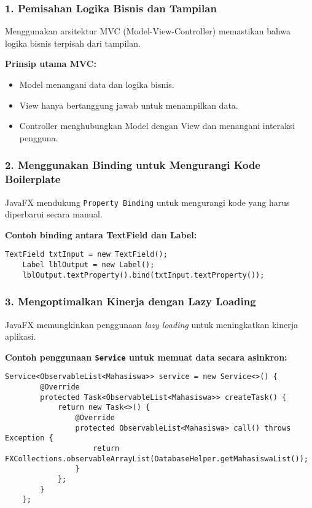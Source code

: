 \subsubsection{1. Pemisahan Logika Bisnis dan Tampilan}

Menggunakan arsitektur MVC (Model-View-Controller) memastikan bahwa logika bisnis terpisah dari tampilan.

\textbf{Prinsip utama MVC:}
\begin{itemize}
	\item Model menangani data dan logika bisnis.
	\item View hanya bertanggung jawab untuk menampilkan data.
	\item Controller menghubungkan Model dengan View dan menangani interaksi pengguna.
\end{itemize}

\subsubsection{2. Menggunakan Binding untuk Mengurangi Kode Boilerplate}

JavaFX mendukung \texttt{Property Binding} untuk mengurangi kode yang harus diperbarui secara manual.

\textbf{Contoh binding antara TextField dan Label:}
\begin{lstlisting}[style=JavaStyle, caption=Binding dalam JavaFX]
	TextField txtInput = new TextField();
	Label lblOutput = new Label();
	lblOutput.textProperty().bind(txtInput.textProperty());
\end{lstlisting}

\subsubsection{3. Mengoptimalkan Kinerja dengan Lazy Loading}

JavaFX memungkinkan penggunaan \textit{lazy loading} untuk meningkatkan kinerja aplikasi.

\textbf{Contoh penggunaan \texttt{Service} untuk memuat data secara asinkron:}
\begin{lstlisting}[style=JavaStyle, caption=Lazy Loading dalam JavaFX]
	Service<ObservableList<Mahasiswa>> service = new Service<>() {
		@Override
		protected Task<ObservableList<Mahasiswa>> createTask() {
			return new Task<>() {
				@Override
				protected ObservableList<Mahasiswa> call() throws Exception {
					return FXCollections.observableArrayList(DatabaseHelper.getMahasiswaList());
				}
			};
		}
	};
\end{lstlisting}

